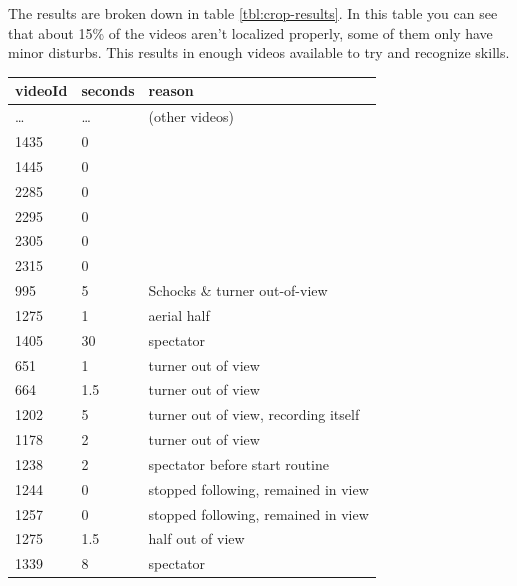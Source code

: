 The results are broken down in table \ref{tbl:crop-results}. In this table you can see that about 15\% of the videos aren't localized properly, some of them only have minor disturbs. This results in enough videos available to try and recognize skills.


\begin{table}[h!]
    \begin{tabular}{|l|l|l|}
        \hline
        \textbf{videoId} & \textbf{seconds} & \textbf{reason} \\
        \hline
        \dots & \cellcolor{green!25} \dots & (other videos) \\ \hline
        1435 &	\cellcolor{green!25} 0 &	 \\ \hline
        1445 &	\cellcolor{green!25} 0 &	 \\ \hline
        2285 &	\cellcolor{green!25} 0 &	 \\ \hline
        2295 &	\cellcolor{green!25} 0 &	 \\ \hline
        2305 &	\cellcolor{green!25} 0 &	 \\ \hline
        2315 &	\cellcolor{green!25} 0 &	 \\ \hline
        995  &	\cellcolor{yellow!25} 5 &	Schocks \& turner out-of-view \\ \hline
        1275 &	\cellcolor{yellow!25} 1 &	aerial half \\ \hline
        1405 &	\cellcolor{orange!25} 30 &	spectator \\ \hline
        651  &	\cellcolor{yellow!25} 1    &	turner out of view \\ \hline
        664  &	\cellcolor{yellow!25} 1.5  &	turner out of view \\ \hline
        1202 &	\cellcolor{yellow!25} 5    &	turner out of view, recording itself \\ \hline
        1178 &	\cellcolor{yellow!25} 2    &	turner out of view \\ \hline
        1238 &	\cellcolor{yellow!25} 2    &	spectator before start routine \\ \hline
        1244 &	\cellcolor{yellow!25} 0    &	stopped following, remained in view \\ \hline
        1257 &	\cellcolor{yellow!25} 0    &	stopped following, remained in view \\ \hline
        1275 &	\cellcolor{yellow!25} 1.5  &	half out of view \\ \hline
        1339 &	\cellcolor{yellow!25} 8    &  spectator \\ \hline

\end{tabular}
\end{table}
